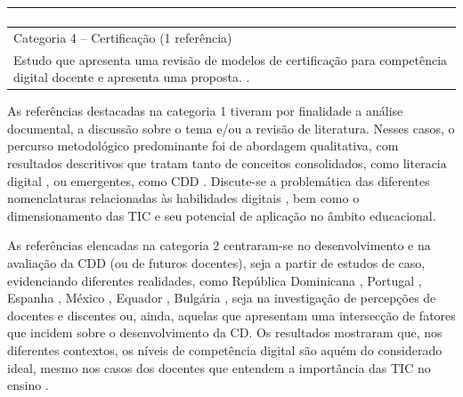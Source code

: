 \documentclass[portuguese]{textolivre}
\begin{document}
\begin{table}[h!]
\begin{threeparttable}
\begin{tabular}{p{}}
\begin{enumerate}[label=\alph*.]
\end{enumerate}
\\
\hline 
Categoria 4 – Certificação (1 referência) \\
Estudo que apresenta uma revisão de modelos de certificação para competência digital docente e apresenta uma proposta. \textcite{cuartero_certificacion_2019}.
\\
\hline
\end{tabular}
\end{threeparttable}
\end{table}

As referências destacadas na categoria 1 tiveram por finalidade a análise documental, a discussão sobre o tema e/ou a revisão de literatura. Nesses casos, o percurso metodológico predominante foi de abordagem qualitativa, com resultados descritivos que tratam tanto de conceitos consolidados, como literacia digital \cite{stordy_taxonomy_2015,reddy_digital_2020}, ou emergentes, como CDD \cite{spante_digital_2018,garcia_impacto_2019}. Discute-se a problemática das diferentes nomenclaturas relacionadas às habilidades digitais \cite{park_scientometric_2020}, bem como o dimensionamento das TIC e seu potencial de aplicação no âmbito educacional.

As referências elencadas na categoria 2 centraram-se no desenvolvimento e na avaliação da CDD (ou de futuros docentes), seja a partir de estudos de caso, evidenciando diferentes realidades, como República Dominicana \cite{diaz_competencia_2019}, Portugal \cite{trindade_assessment_2020}, Espanha \cite{boudet_evaluacion_2017,marquez_competencias_2018,repiso_alisis_2016,escudero_alisis_2019,ruiz_profesorado_2016}, México \cite{flores_practica_2020}, Equador \cite{cabezas_university_2020}, Bulgária \cite{tsankov_digital_2019}, seja na investigação de percepções de docentes e discentes \cite{ata_exploring_2019,coscollola_fomentando_2020} ou, ainda, aquelas que apresentam uma intersecção de fatores que incidem sobre o desenvolvimento da CD. Os resultados mostraram que, nos diferentes contextos, os níveis de competência digital são aquém do considerado ideal, mesmo nos casos dos docentes que entendem a importância das TIC no ensino \cite{cabezas_university_2020}.
\end{document}

